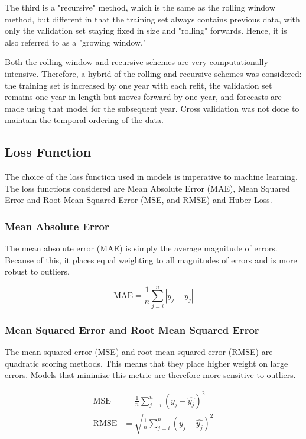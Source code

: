 \documentclass[a4paper, table]{article}
\begin{document}
The third is a "recursive" method, which is the same as the rolling window method, but different in that the training set always contains previous data, with only the validation set staying fixed in size and "rolling" forwards. Hence, it is also referred to as a "growing window."

Both the rolling window and recursive schemes are very computationally intensive. Therefore, a hybrid of the rolling and recursive schemes was considered: the training set is increased by one year with each refit, the validation set remains one year in length but moves forward by one year, and forecasts are made using that model for the subsequent year. Cross validation was not done to maintain the temporal ordering of the data.

\subsection{Loss Function}

The choice of the loss function used in models is imperative to machine learning. The loss functions considered are Mean Absolute Error (MAE), Mean Squared Error and Root Mean Squared Error (MSE, and RMSE) and Huber Loss.

\subsubsection{Mean Absolute Error}

The mean absolute error (MAE) is simply the average magnitude of errors. Because of this, it places equal weighting to all magnitudes of errors and is more robust to outliers. 

\begin{equation}
	\text{MAE} = \frac{1}{n} \sum_{j = i}^{n} |y_j - \hat{y_j}|
\end{equation}

\subsubsection{Mean Squared Error and Root Mean Squared Error}

The mean squared error (MSE) and root mean squared error (RMSE) are quadratic scoring methods. This means that they place higher weight on large errors. Models that minimize this metric are therefore more sensitive to outliers. 

\begin{align}
	\text{MSE} &= \frac{1}{n} \sum_{j = i}^{n} \left( y_j - \hat{y_j}\right) ^2 \\
	\text{RMSE} &= \sqrt{ \frac{1}{n} \sum_{j = i}^{n} \left( y_j - \hat{y_j}\right) ^2}
\end{align}
\end{document}

